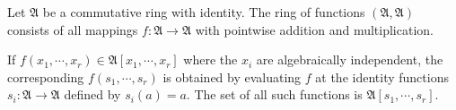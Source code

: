 Let $\mathfrak{A}$ be a commutative ring with identity. The ring of functions $(\mathfrak{A}, \mathfrak{A})$ consists of all mappings $f : \mathfrak{A} \to \mathfrak{A}$ with pointwise addition and multiplication.

If $f(x_1, \cdots, x_r) \in \mathfrak{A}[x_1, \cdots, x_r]$ where the $x_i$ are algebraically independent, the corresponding  $f(s_1, \cdots, s_r)$ is obtained by evaluating $f$ at the identity functions $s_i : \mathfrak{A} \to \mathfrak{A}$ defined by $s_i(a) = a$. The set of all such functions is $\mathfrak{A}[s_1, \cdots, s_r]$.
